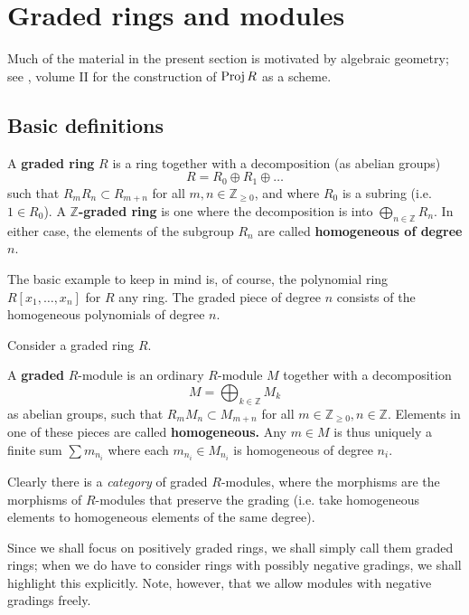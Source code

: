 \section{Graded rings and modules}

Much of the material in the present section is motivated by algebraic
geometry; see \cite{EGA}, volume II for the construction of $\operatorname{Proj} R$ as a
scheme.

\subsection{Basic definitions}
\begin{definition} 
A \textbf{graded ring} $R$ is a ring together with a decomposition (as abelian
groups)
\[  R = R_0 \oplus R_1 \oplus \dots   \]
such that $R_m R_n \subset R_{m+n}$ for all $m, n \in \mathbb{Z}_{\geq 0}$,
and where $R_0$ is a subring (i.e. $1 \in R_0$).
A \textbf{$\mathbb{Z}$-graded ring} is one where the decomposition is into
$\bigoplus_{n \in \mathbb{Z}} R_n$.
In either case, the elements of the subgroup $R_n$ are called
\textbf{homogeneous of degree $n$}.
\end{definition}

The basic example to keep in mind is, of course, the polynomial ring $R[x_1,
\dots, x_n]$ for $R$ any ring. The graded piece of degree $n$ consists of the
homogeneous polynomials of degree $n$.

Consider a graded ring $R$.
\begin{definition} 
A \textbf{graded} $R$-module is an ordinary $R$-module $M$ together with a
decomposition
\[  M = \bigoplus_{k \in \mathbb{Z}} M_k  \]
as abelian groups, such that $R_m M_n \subset M_{m+n}$ for all $m \in
\mathbb{Z}_{\geq 0}, n \in \mathbb{Z}$. Elements in one of these pieces are
called \textbf{homogeneous.}
Any $m \in M$ is thus uniquely a finite sum $\sum m_{n_i}$ where each $m_{n_i}
\in M_{n_i}$ is homogeneous of degree $n_i$.
\end{definition} 

Clearly there is a \emph{category} of graded $R$-modules, where the morphisms
are the morphisms of $R$-modules that preserve the grading (i.e. take
homogeneous elements to homogeneous elements of the same degree).

Since we shall focus on positively graded rings, we shall simply call them
graded rings; when we do have to consider rings with possibly negative
gradings, we shall highlight this explicitly. Note, however, that we allow
modules with negative gradings freely.

